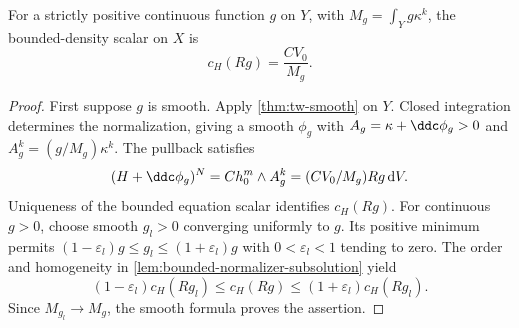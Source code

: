 \begin{lemma}\label{lem:split-product-normalization}
For a strictly positive continuous function $g$ on $Y$, with $M_g=\int_Yg\kappa^k$, the bounded-density scalar on $X$ is
\[
 c_H(Rg)=\frac{CV_0}{M_g}.
\]
\end{lemma}
\begin{proof}
First suppose $g$ is smooth. Apply \cref{thm:tw-smooth} on $Y$. Closed integration determines the normalization, giving a smooth $\phi_g$ with $A_g=\kappa+\ddc\phi_g>0$ and $A_g^k=(g/M_g)\kappa^k$. The pullback satisfies
\[
 (H+\ddc\phi_g)^N=C h_0^m\wedge A_g^k
                    =(CV_0/M_g)Rg\,\mathrm{d}V.
\]
Uniqueness of the bounded equation scalar identifies $c_H(Rg)$. For continuous $g>0$, choose smooth $g_l>0$ converging uniformly to $g$. Its positive minimum permits $(1-\varepsilon_l)g\leq g_l\leq(1+\varepsilon_l)g$ with $0<\varepsilon_l<1$ tending to zero. The order and homogeneity in \cref{lem:bounded-normalizer-subsolution} yield
\[
 (1-\varepsilon_l)c_H(Rg_l)\leq c_H(Rg)
                         \leq(1+\varepsilon_l)c_H(Rg_l).
\]
Since $M_{g_l}\to M_g$, the smooth formula proves the assertion.
\end{proof}

